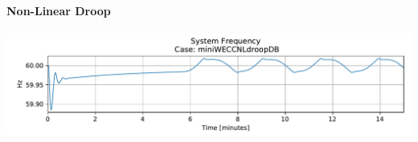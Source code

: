 \documentclass[12pt]{article}
\begin{document}
\begin{multicols}{2}
\paragraph{Non-Linear Droop}
\includegraphics[width=\linewidth]{NLdroopDB}

\end{multicols}
\end{document}

